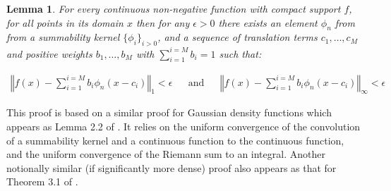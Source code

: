 \documentclass{article} %
\newcommand{\textcite}{\cite}
\newtheorem{lem}[thm]{Lemma}
\begin{document}
\begin{lem}\label{lem:approxwithsummability}
For every continuous non-negative function with compact support $f$,
for all points in its domain $x$
then for any $\epsilon >0$ there exists an element $\phi_n$ from from a summability kernel $\lbrace \phi_i  \rbrace_{i>0}$, and a sequence of translation terms $c_1,\ldots,c_M$ and positive weights $b_1,\ldots,b_M$ with $\sum_{i=1}^{i=M} b_i = 1$ such that:


\begin{align}
\left\Vert f(x)-\sum_{i=1}^{i=M}b_{i}\phi_{n}(x-c_i)\right\Vert _{1}<\epsilon &&
 \text{and} &&
\left\Vert f(x)-\sum_{i=1}^{i=M}b_{i}\phi_{n}(x-c_i)\right\Vert _{\infty}<\epsilon
\end{align}

\end{lem}

This proof is based on a similar proof for Gaussian density functions which appears as Lemma 2.2 of \textcite{bacharoglou2010approximation}.
It relies on the uniform convergence of the convolution of a summability kernel and a continuous function to the continuous function, and the uniform convergence of the Riemann sum to an integral.
Another notionally similar (if significantly more dense) proof also appears as that for Theorem 3.1 of \textcite{NESTORIDIS20111783}.
\end{document}
